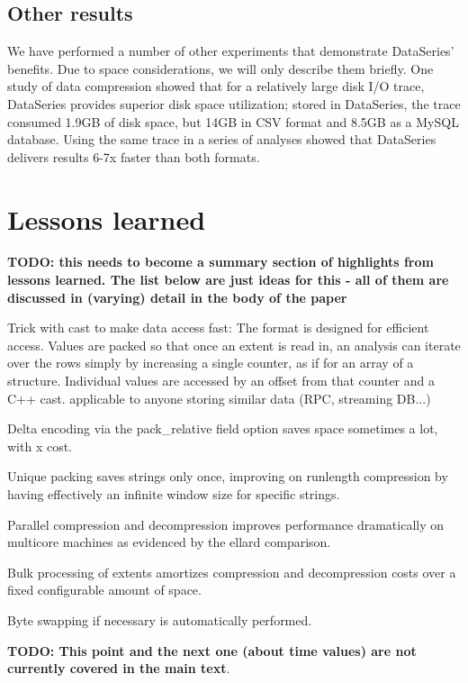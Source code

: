 \documentclass{acm_proc_article-sp}
\begin{document}
\subsection{Other results}\label{sec:otherresults}

We have performed a number of other experiments that demonstrate
DataSeries' benefits. Due to space considerations, we will only
describe them briefly. One study of data compression showed that for a
relatively large disk I/O trace, DataSeries provides superior disk
space utilization; stored in DataSeries, the trace consumed 1.9GB of
disk space, but 14GB in CSV format and 8.5GB as a MySQL
database. Using the same trace in a series of analyses showed that
DataSeries delivers results 6-7x faster than both formats.

\section{Lessons learned}\label{sec:lessonslearned}

{\bf TODO: this needs to become a summary section of highlights from lessons
learned. The list below are just ideas for this - all of them are discussed
in (varying) detail in the body of the paper}

Trick with cast to make data access fast: The format is designed for
efficient access. Values are packed so that once an extent is read in,
an analysis can iterate over the rows simply by increasing a single
counter, as if for an array of a structure.  Individual values are
accessed by an offset from that counter and a C++ cast.  applicable to
anyone storing similar data (RPC, streaming DB...)

Delta encoding via the pack\_relative field option saves space
sometimes a lot, with x cost.

Unique packing saves strings only once, improving on runlength
compression by having effectively an infinite window size for specific
strings.

Parallel compression and decompression improves performance
dramatically on multicore machines as evidenced by the ellard
comparison.

Bulk processing of extents amortizes compression and decompression
costs over a fixed configurable amount of space.

Byte swapping if necessary is automatically performed.

{\bf TODO: This point and the next one (about time values) are not
currently covered in the main text}. 
\end{document}
